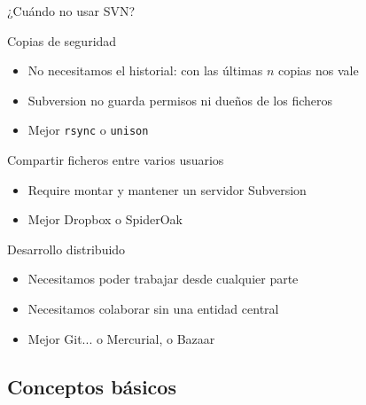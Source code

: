 \documentclass[xcolor=svgnames]{beamer}
\newcommand*{\programa}[1]{\texttt{#1}}
\begin{document}
\begin{frame}{¿Cuándo no usar SVN?}

  \begin{block}{Copias de seguridad}
    \begin{itemize}
    \item No necesitamos el historial: con las últimas $n$ copias nos
      vale
    \item Subversion no guarda permisos ni dueños de los ficheros
    \item Mejor \programa{rsync} o \programa{unison}
    \end{itemize}
  \end{block}

  \begin{block}{Compartir ficheros entre varios usuarios}
    \begin{itemize}
    \item Require montar y mantener un servidor Subversion
    \item Mejor Dropbox o SpiderOak
    \end{itemize}
  \end{block}

  \begin{block}{Desarrollo distribuido}
    \begin{itemize}
    \item Necesitamos poder trabajar desde cualquier parte
    \item Necesitamos colaborar sin una entidad central
    \item Mejor Git... o Mercurial, o Bazaar
    \end{itemize}
  \end{block}

\end{frame}

\subsection{Conceptos básicos}
\end{document}
